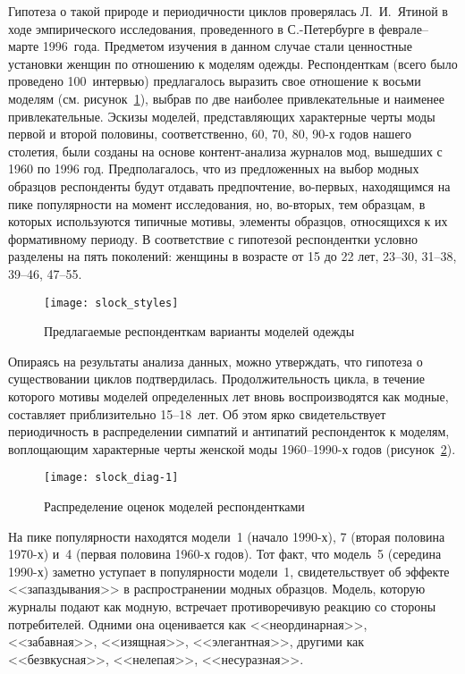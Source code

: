   Гипотеза о такой природе и периодичности циклов проверялась Л.~И.~Ятиной в
  ходе эмпирического исследования, проведенного в С.-Петербурге в
  феврале--марте 1996~года. Предметом изучения в данном случае стали ценностные
  установки женщин по отношению к моделям одежды. Респонденткам (всего было
  проведено 100~интервью) предлагалось выразить свое отношение к восьми моделям
  (см. рисунок~\ref{pic:1}), выбрав по две наиболее привлекательные и наименее
  привлекательные. Эскизы моделей, представляющих характерные черты моды первой
  и второй половины, соответственно, 60, 70, 80, 90-х годов нашего столетия,
  были созданы на основе контент-анализа журналов мод, вышедших с 1960 по
  1996 год. Предполагалось, что из предложенных на выбор модных образцов
  респонденты будут отдавать предпочтение, во-первых, находящимся на пике
  популярности на момент исследования, но, во-вторых, тем образцам, в которых
  используются типичные мотивы, элементы образцов, относящихся к их формативному
  периоду. В соответствие с гипотезой респондентки условно разделены на пять
  поколений: женщины в возрасте от 15 до 22 лет, 23--30, 31--38, 39--46, 47--55.
  
  \begin{figure}[t!]
    \center
    \texttt{[image: slock\_styles]}
    \caption{Предлагаемые респонденткам варианты моделей одежды}
    \label{pic:1}
  \end{figure}
  
  Опираясь на результаты анализа данных, можно утверждать, что гипотеза о
  существовании циклов подтвердилась. Продолжительность цикла, в течение
  которого мотивы моделей определенных лет вновь воспроизводятся как модные,
  составляет приблизительно 15--18~лет. Об этом ярко свидетельствует
  периодичность в распределении симпатий и антипатий респонденток к моделям,
  воплощающим характерные черты женской моды 1960--1990-х годов
  (рисунок~\ref{diag:1}).

  \begin{figure}[b!]
    \center
    \texttt{[image: slock\_diag-1]}
    \caption{Распределение оценок моделей респондентками}
    \label{diag:1}
  \end{figure}
 
  На пике популярности находятся модели~1 (начало 1990-х), 7 (вторая половина
  1970-х) и~4 (первая половина 1960-х годов). Тот факт, что модель~5 (середина
  1990-х) заметно уступает в популярности модели~1, свидетельствует об эффекте
  <<запаздывания>> в распространении модных образцов. Модель, которую журналы
  подают как модную, встречает противоречивую реакцию со стороны потребителей.
  Одними она оценивается как <<неординарная>>, <<забавная>>, <<изящная>>,
  <<элегантная>>, другими как <<безвкусная>>, <<нелепая>>, <<несуразная>>.
  

